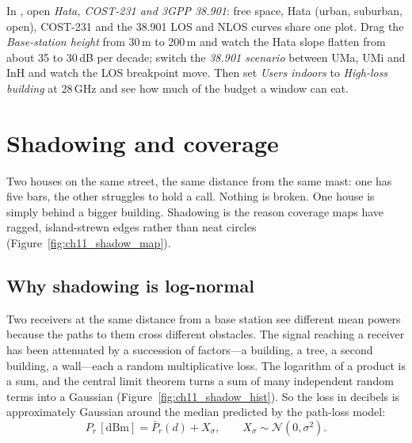 \begin{tryit}
In , open \emph{Hata, COST-231 and 3GPP 38.901}: free space,
Hata (urban, suburban, open), COST-231 and the 38.901 LOS and NLOS curves share one plot. Drag the
\emph{Base-station height} from 30\,m to 200\,m and watch the Hata slope flatten from about 35 to
30\,dB per decade; switch the \emph{38.901 scenario} between UMa, UMi and InH and watch the LOS
breakpoint move. Then set \emph{Users indoors} to \emph{High-loss building} at 28\,GHz and see how much
of the budget a window can eat.
\end{tryit}

\section{Shadowing and coverage}
\label{sec:ch11:shadowing}

Two houses on the same street, the same distance from the same mast: one has five bars, the
other struggles to hold a call. Nothing is broken. One house is simply behind a bigger building.
Shadowing is the reason coverage maps have ragged, island-strewn edges rather than neat circles
(Figure~\ref{fig:ch11_shadow_map}).


\subsection{Why shadowing is log-normal}

Two receivers at the same distance from a base station see different mean powers because the
paths to them cross different obstacles. The signal reaching a receiver has been attenuated by a
succession of factors---a building, a tree, a second building, a wall---each a random
multiplicative loss. The logarithm of a product is a sum, and the central limit theorem turns a
sum of many independent random terms into a Gaussian (Figure~\ref{fig:ch11_shadow_hist}). So the
loss in decibels is approximately Gaussian around the median predicted by the path-loss model:
\begin{equation}
P_r\,[\mathrm{dBm}]=\bar P_r(d)+X_\sigma,\qquad X_\sigma\sim\mathcal N(0,\sigma^2).
\end{equation}



